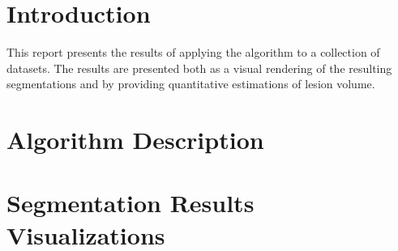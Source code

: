 \documentclass{InsightArticle}
\begin{document}
\section{Introduction}

This report presents the results of applying the algorithm to a collection of
datasets. The results are presented both as a visual rendering of the resulting
segmentations and by providing quantitative estimations of lesion volume.

\section{Algorithm Description}

\section{Segmentation Results Visualizations}



\small
\listoffigures
\listoftables
\normalsize
\end{document}
